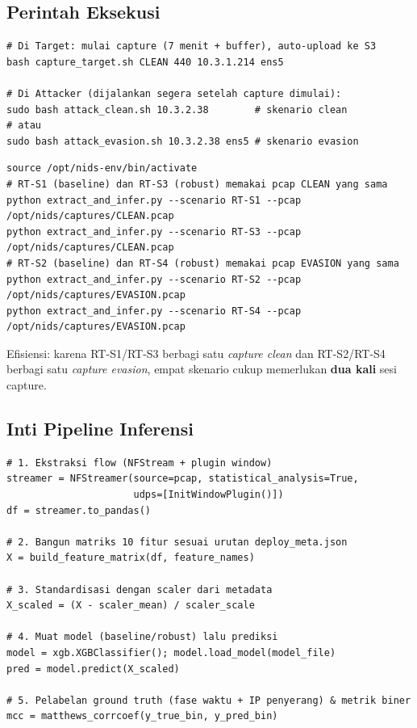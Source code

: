 \documentclass[11pt, a4paper]{article}
\begin{document}
\subsection{Perintah Eksekusi}
\begin{lstlisting}[style=bash, caption={Menjalankan satu sesi capture + serangan (via AWS SSM)}]
# Di Target: mulai capture (7 menit + buffer), auto-upload ke S3
bash capture_target.sh CLEAN 440 10.3.1.214 ens5

# Di Attacker (dijalankan segera setelah capture dimulai):
sudo bash attack_clean.sh 10.3.2.38        # skenario clean
# atau
sudo bash attack_evasion.sh 10.3.2.38 ens5 # skenario evasion
\end{lstlisting}

\begin{lstlisting}[style=bash, caption={Menjalankan inferensi di Analyzer}]
source /opt/nids-env/bin/activate
# RT-S1 (baseline) dan RT-S3 (robust) memakai pcap CLEAN yang sama
python extract_and_infer.py --scenario RT-S1 --pcap /opt/nids/captures/CLEAN.pcap
python extract_and_infer.py --scenario RT-S3 --pcap /opt/nids/captures/CLEAN.pcap
# RT-S2 (baseline) dan RT-S4 (robust) memakai pcap EVASION yang sama
python extract_and_infer.py --scenario RT-S2 --pcap /opt/nids/captures/EVASION.pcap
python extract_and_infer.py --scenario RT-S4 --pcap /opt/nids/captures/EVASION.pcap
\end{lstlisting}

\noindent Efisiensi: karena RT-S1/RT-S3 berbagi satu \textit{capture clean} dan RT-S2/RT-S4 berbagi satu \textit{capture evasion}, empat skenario cukup memerlukan \textbf{dua kali} sesi capture.

\subsection{Inti Pipeline Inferensi}
\begin{lstlisting}[style=py, caption={Alur inti extract\_and\_infer.py}]
# 1. Ekstraksi flow (NFStream + plugin window)
streamer = NFStreamer(source=pcap, statistical_analysis=True,
                      udps=[InitWindowPlugin()])
df = streamer.to_pandas()

# 2. Bangun matriks 10 fitur sesuai urutan deploy_meta.json
X = build_feature_matrix(df, feature_names)

# 3. Standardisasi dengan scaler dari metadata
X_scaled = (X - scaler_mean) / scaler_scale

# 4. Muat model (baseline/robust) lalu prediksi
model = xgb.XGBClassifier(); model.load_model(model_file)
pred = model.predict(X_scaled)

# 5. Pelabelan ground truth (fase waktu + IP penyerang) & metrik biner
mcc = matthews_corrcoef(y_true_bin, y_pred_bin)
\end{lstlisting}
\end{document}
